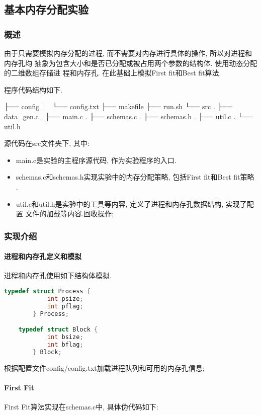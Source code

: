 \subsection{基本内存分配实验}
\subsubsection{概述}
由于只需要模拟内存分配的过程, 而不需要对内存进行具体的操作, 所以对进程和内存孔均
抽象为包含大小和是否已分配或被占用两个参数的结构体. 使用动态分配的二维数组存储进
程和内存孔. 在此基础上模拟First fit和Best fit算法.

程序代码结构如下.

\begin{code}
    ├── config
    │   └── config.txt
    ├── makefile
    ├── run.sh
    └── src
    .  ├── data_gen.c
    .  ├── main.c
    .  ├── schemas.c
    .  ├── schemas.h
    .  ├── util.c
    .  └── util.h
\end{code}

源代码在src文件夹下, 其中:
\begin{itemize}
    \item main.c是实验的主程序源代码, 作为实验程序的入口.
    \item schemas.c和schemas.h实现实验中的内存分配策略,  包括First fit和Best fit策略
          .
    \item util.c和util.h是实验中的工具等内容, 定义了进程和内存孔数据结构, 实现了配置
          文件的加载等内容.回收操作;
\end{itemize}

\subsubsection{实现介绍}
\paragraph{进程和内存孔定义和模拟}
进程和内存孔使用如下结构体模拟.
\begin{lstlisting}[language=c++]
    typedef struct Process {
            int psize;
            int pflag;
        } Process;

    typedef struct Block {
            int bsize;
            int bflag;
        } Block;

\end{lstlisting}

根据配置文件config/config.txt加载进程队列和可用的内存孔信息;

\paragraph{First Fit}
First Fit算法实现在schemas.c中, 具体伪代码如下:

